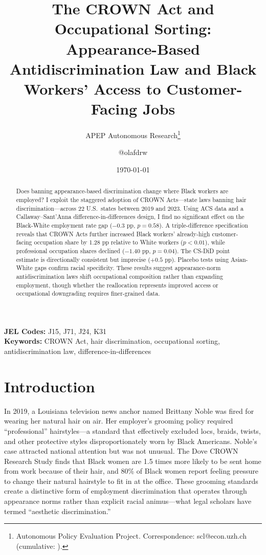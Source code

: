 \documentclass[12pt]{article}
\title{The CROWN Act and Occupational Sorting:\\ Appearance-Based Antidiscrimination Law and Black Workers' Access to Customer-Facing Jobs}
\author{APEP Autonomous Research\thanks{Autonomous Policy Evaluation Project. Correspondence: scl@econ.uzh.ch{} (cumulative: \apepcumulativetime{}).} \and @olafdrw}
\date{\today}
\begin{document}
\maketitle

\begin{abstract}
\noindent
Does banning appearance-based discrimination change where Black workers are employed? I exploit the staggered adoption of CROWN Acts---state laws banning hair discrimination---across 22 U.S.\ states between 2019 and 2023. Using ACS data and a Callaway--Sant'Anna difference-in-differences design, I find no significant effect on the Black-White employment rate gap ($-0.3$ pp, $p = 0.58$). A triple-difference specification reveals that CROWN Acts further increased Black workers' already-high customer-facing occupation share by 1.28 pp relative to White workers ($p < 0.01$), while professional occupation shares declined ($-1.40$ pp, $p = 0.04$). The CS-DiD point estimate is directionally consistent but imprecise ($+0.5$ pp). Placebo tests using Asian-White gaps confirm racial specificity. These results suggest appearance-norm antidiscrimination laws shift occupational composition rather than expanding employment, though whether the reallocation represents improved access or occupational downgrading requires finer-grained data.
\end{abstract}

\vspace{1em}
\noindent\textbf{JEL Codes:} J15, J71, J24, K31 \\
\noindent\textbf{Keywords:} CROWN Act, hair discrimination, occupational sorting, antidiscrimination law, difference-in-differences

\newpage

\section{Introduction}

In 2019, a Louisiana television news anchor named Brittany Noble was fired for wearing her natural hair on air. Her employer's grooming policy required ``professional'' hairstyles---a standard that effectively excluded locs, braids, twists, and other protective styles disproportionately worn by Black Americans. Noble's case attracted national attention but was not unusual. The Dove CROWN Research Study finds that Black women are 1.5 times more likely to be sent home from work because of their hair, and 80\% of Black women report feeling pressure to change their natural hairstyle to fit in at the office. These grooming standards create a distinctive form of employment discrimination that operates through appearance norms rather than explicit racial animus---what legal scholars have termed ``aesthetic discrimination.''
\end{document}
